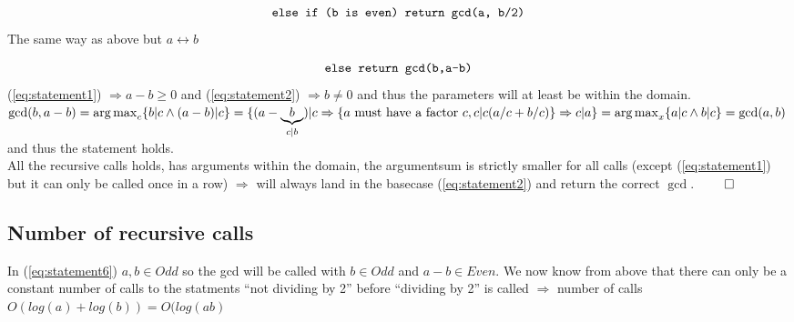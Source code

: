 \documentclass[a4paper,twoside=false,abstract=false,numbers=noenddot,
titlepage=false,headings=small,parskip=half,version=last]{scrartcl}
\DeclareMathOperator*{\argmax}{arg\,max}
\begin{document}
\begin{equation} \label{eq:statement5}
    \verb+else if (b is even) return gcd(a, b/2)+
\end{equation}
The same way as above but $a \leftrightarrow b$

\begin{equation} \label{eq:statement6}
    \verb+else return gcd(b,a-b)+
\end{equation}
(\ref{eq:statement1}) $\Rightarrow a-b \ge 0$ and (\ref{eq:statement2}) $\Rightarrow b \neq 0$ and thus the parameters will at least be within the domain. \\

$
    \gcd(b,a-b)=\argmax_c \{b|c \wedge (a-b)|c\}=\\
    \{ (a-\underbrace{b}_{c|b})|c \Rightarrow
    \{ \text{$a$ must have a factor $c$}, c|c(a/c+b/c) \} \Rightarrow
    c|a \}\\
    =\argmax_x \{a|c \wedge b|c\}=\gcd(a,b)
$
and thus the statement holds. \\

All the recursive calls holds, has arguments within the domain, the argumentsum is strictly smaller for all calls 
(except (\ref{eq:statement1}) but it can only be called once in a row) 
$\Rightarrow$ will always land in the basecase (\ref{eq:statement2}) and return the correct $\gcd$. $\qed$

\subsection{Number of recursive calls}

In (\ref{eq:statement6}) $a,b \in Odd$ so the gcd will be called with $b \in Odd$ and $a-b \in Even$.
We now know from above that there can only be a constant number of calls to the statments ``not dividing by 2'' before ``dividing by 2'' is called $\Rightarrow$ number of calls $O(log(a)+log(b))=O(log(ab)$

\end{document}
